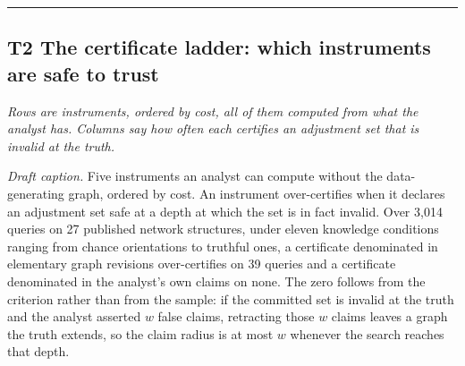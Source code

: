\vspace{6pt}
\hrule
\subsection*{T2 \quad The certificate ladder: which instruments are safe to trust}

\emph{Rows are instruments, ordered by cost, all of them computed from what the analyst has.
Columns say how often each certifies an adjustment set that is invalid at the truth.}

\begin{center}\footnotesize
{}
\end{center}
\vspace{-4pt}

\vspace{4pt}
\noindent\emph{Draft caption.} Five instruments an analyst can compute without the
data-generating graph, ordered by cost. An instrument over-certifies when it declares an adjustment
set safe at a depth at which the set is in fact invalid. Over 3{,}014 queries on 27 published
network structures, under eleven knowledge conditions ranging from chance orientations to truthful
ones, a certificate denominated in elementary graph revisions over-certifies on 39 queries and a
certificate denominated in the analyst's own claims on none. The zero follows from the criterion
rather than from the sample: if the committed set is invalid at the truth and the analyst asserted
$w$ false claims, retracting those $w$ claims leaves a graph the truth extends, so the claim radius
is at most $w$ whenever the search reaches that depth.

